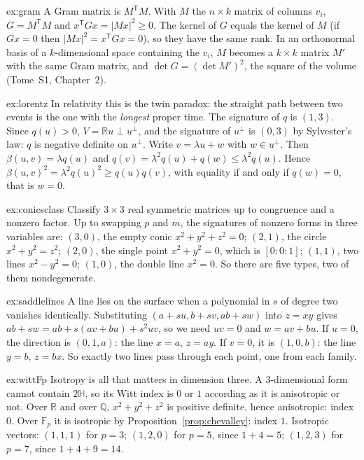 \begin{solution}{ex:gram}
\idea A Gram matrix is $M^{\mathsf T}M$.
\writeup With $M$ the $n\times k$ matrix of columns $v_i$, $G=M^{\mathsf T}M$ and $x^{\mathsf T}Gx=|Mx|^2\ge0$. The kernel of $G$ equals the kernel of $M$
(if $Gx=0$ then $|Mx|^2=x^{\mathsf T}Gx=0$), so they have the same rank. In an orthonormal basis of a $k$-dimensional space containing the $v_i$, $M$
becomes a $k\times k$ matrix $M'$ with the same Gram matrix, and $\det G=(\det M')^2$, the square of the volume (Tome~S1, Chapter~2).
\end{solution}

\begin{solution}{ex:lorentz}
\idea In relativity this is the twin paradox: the straight path between two events is the one with the \emph{longest} proper time.
\writeup The signature of $q$ is $(1,3)$. Since $q(u)>0$, $V=\mathbb Ru\perp u^\perp$, and the signature of $u^\perp$ is $(0,3)$ by Sylvester's law: $q$ is
negative definite on $u^\perp$. Write $v=\lambda u+w$ with $w\in u^\perp$. Then $\beta(u,v)=\lambda q(u)$ and $q(v)=\lambda^2q(u)+q(w)\le\lambda^2q(u)$. Hence
$\beta(u,v)^2=\lambda^2q(u)^2\ge q(u)q(v)$, with equality if and only if $q(w)=0$, that is $w=0$.
\end{solution}

\begin{solution}{ex:conicsclass}
\idea Classify $3\times3$ real symmetric matrices up to congruence and a nonzero factor.
\writeup Up to swapping $p$ and $m$, the signatures of nonzero forms in three variables are: $(3,0)$, the empty conic $x^2+y^2+z^2=0$; $(2,1)$, the circle
$x^2+y^2=z^2$; $(2,0)$, the single point $x^2+y^2=0$, which is $[0:0:1]$; $(1,1)$, two lines $x^2-y^2=0$; $(1,0)$, the double line $x^2=0$. So there are
five types, two of them nondegenerate.
\end{solution}

\begin{solution}{ex:saddlelines}
\idea A line lies on the surface when a polynomial in $s$ of degree two vanishes identically.
\writeup Substituting $(a+su,b+sv,ab+sw)$ into $z=xy$ gives $ab+sw=ab+s(av+bu)+s^2uv$, so we need $uv=0$ and $w=av+bu$. If $u=0$, the direction is
$(0,1,a)$: the line $x=a$, $z=ay$. If $v=0$, it is $(1,0,b)$: the line $y=b$, $z=bx$. So exactly two lines pass through each point, one from each family.
\end{solution}

\begin{solution}{ex:wittFp}
\idea Isotropy is all that matters in dimension three.
\writeup A $3$-dimensional form cannot contain $2\mathbb H$, so its Witt index is $0$ or $1$ according as it is anisotropic or not. Over $\mathbb R$ and
over $\mathbb Q$, $x^2+y^2+z^2$ is positive definite, hence anisotropic: index $0$. Over $\mathbb F_p$ it is isotropic by Proposition~\ref{prop:chevalley}:
index $1$. Isotropic vectors: $(1,1,1)$ for $p=3$; $(1,2,0)$ for $p=5$, since $1+4=5$; $(1,2,3)$ for $p=7$, since $1+4+9=14$.
\end{solution}

